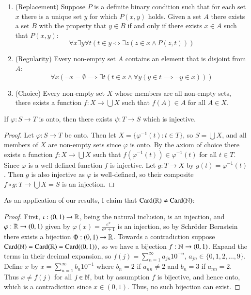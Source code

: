 \begin{subappendices}
\begin{axi}
\begin{enumerate}
            \item (Replacement) Suppose $P$ is a definite binary condition such that for each set $x$ there is a unique set $y$ for which $P(x,y)$ holds. Given a set $A$ there exists a set $B$ with the property that $y \in B$ if and only if there exists $x \in A$ such that $P(x,y)$: $$\forall x\exists y\forall t(t \in y \iff \exists z(z \in x \land P(z,t)))$$
            \item (Regularity) Every non-empty set $A$ contains an element that is disjoint from $A$: $$\forall x(\lnot x = \emptyset \implies \exists t(t \in x \land \forall y(y \in t\implies \lnot y \in x)))$$
            \item (Choice) Every non-empty set $X$ whose members are all non-empty sets, there exists a function $f:X\rightarrow \bigcup X$ such that $f(A) \in A$ for all $A \in X$.
        \end{enumerate}
    \end{axi}

    \begin{lem}
        If $\varphi:S\rightarrow T$ is onto, then there exists $\psi:T\rightarrow S$ which is injective.
    \end{lem}
    \begin{proof}
        Let $\varphi:S\rightarrow T$ be onto. Then let $X = \{\varphi^{-1}(t):t \in T\}$, so $S = \bigcup X$, and all members of $X$ are non-empty sets since $\varphi$ is onto. By the axiom of choice there exists a function $f:X\rightarrow \bigcup X$ such that $f(\varphi^{-1}(t)) \in \varphi^{-1}(t)$ for all $t \in T$. Since $\varphi$ is a well defined function $f$ is injective. Let $g:T\rightarrow X$ by $g(t) = \varphi^{-1}(t)$. Then $g$ is also injective as $\varphi$ is well-defined, so their composite $f\circ g:T\rightarrow \bigcup X = S$ is an injection.
    \end{proof} 

    As an application of our results, I claim that $\text{Card}(\mathbb R)\neq \text{Card}(\mathbb N)$:

    \begin{proof}
        First, $\iota:(0,1)\rightarrow \mathbb R$, being the natural inclusion, is an injection, and $\varphi:\mathbb R\rightarrow (0,1)$ given by $\varphi(x) = \frac{e^x}{e^x+1}$ is an injection, so by Schr\"{o}der Bernstein there exists a bijection $\Phi:(0,1)\rightarrow \mathbb R$. Towards a contradiction suppose $\text{Card}(\mathbb N) = \text{Card}(\mathbb R) = \text{Card}((0,1))$, so we have a bijection $f:\mathbb N\rightarrow (0,1)$. Expand the terms in their decimal expansion, so $f(j) = \sum_{n=1}^{\infty}a_{jn}10^{-n}$, $a_{jn} \in \{0,1,2,...,9\}$. Define $x$ by $x = \sum_{n=1}^{\infty}b_n10^{-1}$ where $b_n = 2$ if $a_{nn} \neq 2$ and $b_n = 3$ if $a_{nn} = 2$. Thus $x \neq f(j)$ for all $j \in \mathbb N$, but by assumption $f$ is bijective, and hence onto, which is a contradiction since $x \in (0,1)$. Thus, no such bijection can exist.
    \end{proof}


\end{subappendices}
